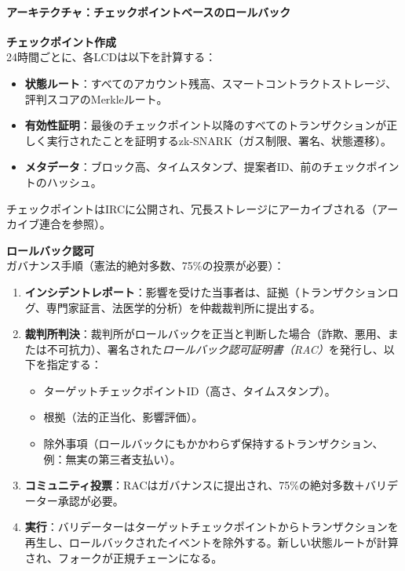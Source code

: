 \documentclass[11pt]{article}
\begin{document}
\paragraph{アーキテクチャ：チェックポイントベースのロールバック}
\textbf{チェックポイント作成}\\
24時間ごとに、各LCDは以下を計算する：
\begin{itemize}[noitemsep]
  \item \textbf{状態ルート}：すべてのアカウント残高、スマートコントラクトストレージ、評判スコアのMerkleルート。
  \item \textbf{有効性証明}：最後のチェックポイント以降のすべてのトランザクションが正しく実行されたことを証明するzk-SNARK（ガス制限、署名、状態遷移）。
  \item \textbf{メタデータ}：ブロック高、タイムスタンプ、提案者ID、前のチェックポイントのハッシュ。
\end{itemize}
チェックポイントはIRCに公開され、冗長ストレージにアーカイブされる（アーカイブ連合を参照）。

\textbf{ロールバック認可}\\
ガバナンス手順（憲法的絶対多数、75\%の投票が必要）：
\begin{enumerate}[noitemsep]
  \item \textbf{インシデントレポート}：影響を受けた当事者は、証拠（トランザクションログ、専門家証言、法医学的分析）を仲裁裁判所に提出する。
  \item \textbf{裁判所判決}：裁判所がロールバックを正当と判断した場合（詐欺、悪用、または不可抗力）、署名された\emph{ロールバック認可証明書（RAC）}を発行し、以下を指定する：
    \begin{itemize}[noitemsep]
      \item ターゲットチェックポイントID（高さ、タイムスタンプ）。
      \item 根拠（法的正当化、影響評価）。
      \item 除外事項（ロールバックにもかかわらず保持するトランザクション、例：無実の第三者支払い）。
    \end{itemize}
  \item \textbf{コミュニティ投票}：RACはガバナンスに提出され、75\%の絶対多数＋バリデーター承認が必要。
  \item \textbf{実行}：バリデーターはターゲットチェックポイントからトランザクションを再生し、ロールバックされたイベントを除外する。新しい状態ルートが計算され、フォークが正規チェーンになる。
\end{enumerate}
\end{document}
